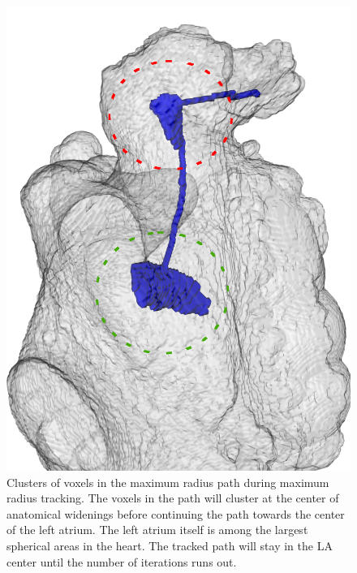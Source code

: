 \documentclass[review]{elsarticle}
\begin{document}
\begin{figure}[t]
  \centering
  \includegraphics[width=0.3\linewidth]{fig17.png}
  \caption{Clusters of voxels in the maximum radius path during maximum
  radius tracking. The voxels in the path will cluster at the center of 
  anatomical widenings before continuing the path towards the center of the 
  left atrium. The left atrium itself is among the  largest spherical areas in 
  the heart. The tracked path will stay in the LA center until the number of iterations 
  runs out.
} 
  \label{fig:centerline_clusters}       %
\end{figure}
\end{document}
